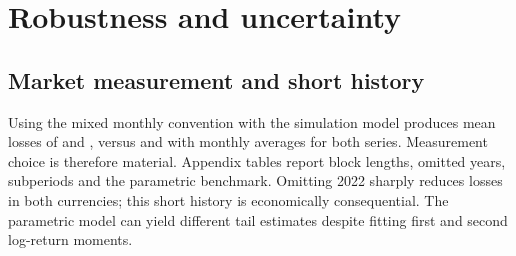\documentclass[11pt,a4paper]{article}
\begin{document}
\section{Robustness and uncertainty}
\subsection{Market measurement and short history}
Using the mixed monthly convention with the simulation model produces mean losses of \ArsMixedLoss{} and \TryMixedLoss{}, versus \ArsLoss{} and \TryLoss{} with monthly averages for both series. Measurement choice is therefore material. Appendix tables report block lengths, omitted years, subperiods and the parametric benchmark. Omitting 2022 sharply reduces losses in both currencies; this short history is economically consequential. The parametric model can yield different tail estimates despite fitting first and second log-return moments.
\begin{table}[H]\centering\small\setlength{\tabcolsep}{4pt}
\caption{ETH adaptive/timely uncertainty. All loss entries are percentages of initial principal. MC halfwidth is $1.96$ times the conditional simulation standard error. Input low/high are 2.5/97.5 percentiles of 100 outer-resampled mean losses; tail low/high are the analogous CVaR$_{99}$ percentiles. They are sensitivity bands, not validated confidence intervals.}\label{tab:uncertainty}\end{table}
\end{document}
